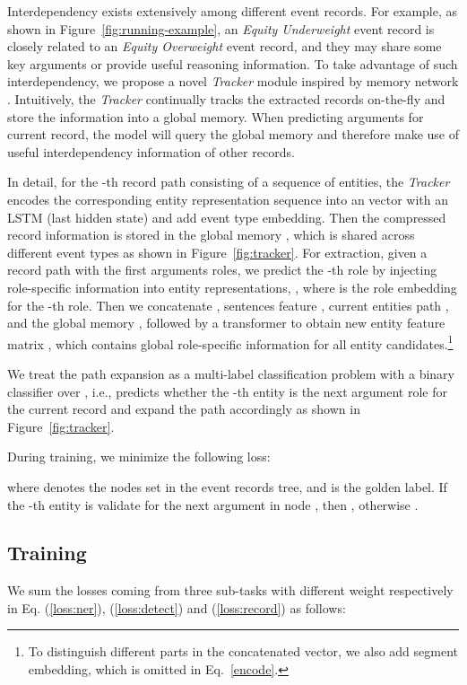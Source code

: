 \documentclass[11pt,a4paper]{article}
\begin{document}
Interdependency exists extensively among different event records.
For example, as shown in Figure~\ref{fig:running-example}, an \textit{Equity Underweight} event record is closely related to an \textit{Equity Overweight} event record, and they may share some key arguments or provide useful reasoning information.
To take advantage of such interdependency, we propose a novel \textit{Tracker} module inspired by memory network \citep{DBLP:journals/corr/WestonCB14}.
Intuitively, the \textit{Tracker} continually tracks the extracted records on-the-fly and store the information into a global memory.
When predicting arguments for current record, the model will query the global memory and therefore make use of useful interdependency information of other records.

In detail, for the -th record path consisting of a sequence of entities, the \textit{Tracker} encodes the corresponding entity representation sequence  into an vector  with an LSTM (last hidden state) and add event type embedding.
Then the compressed record information is stored in the global memory , which is shared across different event types as shown in Figure~\ref{fig:tracker}.
For extraction, given a record path  with the first  arguments roles, we predict the -th role by injecting role-specific information into entity representations, , where  is the role embedding for the -th role.
Then we concatenate , sentences feature , current entities path , and the global memory , followed by a transformer to obtain new entity feature matrix , which contains global role-specific information for all entity candidates.\footnote{To distinguish different parts in the concatenated vector, we also add segment embedding, which is omitted in Eq.~\ref{encode}.}

We treat the path expansion as a multi-label classification problem with a binary classifier over , i.e., predicts whether the -th entity is the next argument role for the current record and expand the path accordingly as shown in Figure~\ref{fig:tracker}.

During training, we minimize the following loss:

where  denotes the nodes set in the event records tree, and  is the golden label.
If the -th entity is validate for the next argument in node , then , otherwise .

\subsection{Training}
We sum the losses coming from three sub-tasks with different weight respectively in Eq. (\ref{loss:ner}), (\ref{loss:detect}) and (\ref{loss:record}) as follows:
\end{document}
